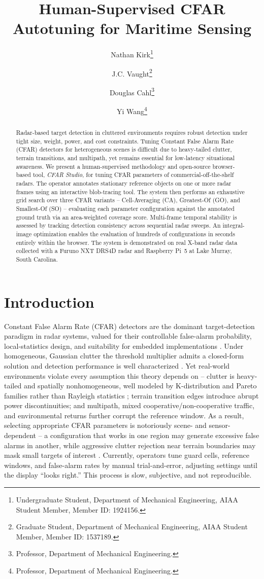 \documentclass[conf]{new-aiaa}
\title{Human-Supervised CFAR Autotuning for Maritime Sensing}
\author{Nathan Kirk\footnote{Undergraduate Student, Department of Mechanical Engineering, AIAA Student Member, Member ID: 1924156.}}
\author{J.C. Vaught\footnote{Graduate Student, Department of Mechanical Engineering, AIAA Student Member, Member ID: 1537189.}}
\author{Douglas Cahl\footnote{Professor, Department of Mechanical Engineering.}}
\author{Yi Wang\footnote{Professor, Department of Mechanical Engineering.}}
\affil{University of South Carolina, Columbia, SC, 29208}
\date{}
\begin{document}
\maketitle

\begin{abstract}
Radar-based target detection in cluttered environments requires robust detection under tight size, weight, power, and cost constraints. Tuning Constant False Alarm Rate (CFAR) detectors for heterogeneous scenes is difficult due to heavy-tailed clutter, terrain transitions, and multipath, yet remains essential for low-latency situational awareness. We present a human-supervised methodology and open-source browser-based tool, \emph{CFAR Studio}, for tuning CFAR parameters of commercial-off-the-shelf radars. The operator annotates stationary reference objects on one or more radar frames using an interactive blob-tracing tool. The system then performs an exhaustive grid search over three CFAR variants -- Cell-Averaging (CA), Greatest-Of (GO), and Smallest-Of (SO) -- evaluating each parameter configuration against the annotated ground truth via an area-weighted coverage score. Multi-frame temporal stability is assessed by tracking detection consistency across sequential radar sweeps. An integral-image optimization enables the evaluation of hundreds of configurations in seconds entirely within the browser. The system is demonstrated on real X-band radar data collected with a Furuno NXT DRS4D radar and Raspberry Pi~5 at Lake Murray, South Carolina.
\end{abstract}

\section{Introduction}
Constant False Alarm Rate (CFAR) detectors are the dominant target-detection paradigm in radar systems, valued for their controllable false-alarm probability, local-statistics design, and suitability for embedded implementations \cite{Farina1987, Gandhi1988}. Under homogeneous, Gaussian clutter the threshold multiplier admits a closed-form solution and detection performance is well characterized \cite{Finn1968, Richards2022}. Yet real-world environments violate every assumption this theory depends on -- clutter is heavy-tailed and spatially nonhomogeneous, well modeled by K-distribution and Pareto families rather than Rayleigh statistics \cite{Ward2006, Rosenberg2013}; terrain transition edges introduce abrupt power discontinuities; and multipath, mixed cooperative/non-cooperative traffic, and environmental returns further corrupt the reference window. As a result, selecting appropriate CFAR parameters is notoriously scene- and sensor-dependent -- a configuration that works in one region may generate excessive false alarms in another, while aggressive clutter rejection near terrain boundaries may mask small targets of interest \cite{DHS2009}. Currently, operators tune guard cells, reference windows, and false-alarm rates by manual trial-and-error, adjusting settings until the display ``looks right.'' This process is slow, subjective, and not reproducible.
\end{document}
